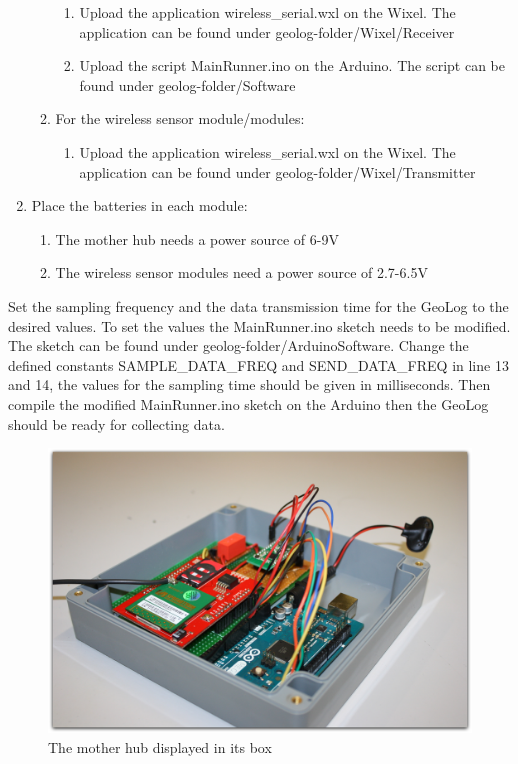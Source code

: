 \begin{enumerate}
\begin{enumerate}
		\begin{enumerate}
		\item Upload the application wireless\_serial.wxl on the Wixel. The application can be found under geolog-folder/Wixel/Receiver
		\item Upload the script MainRunner.ino on the Arduino. The script can be found under geolog-folder/Software
		\end{enumerate}
	\item For the wireless sensor module/modules:
		\begin{enumerate}
		\item Upload the application wireless\_serial.wxl on the Wixel. The application can be found under geolog-folder/Wixel/Transmitter
		\end{enumerate} 
	\end{enumerate}
\item Place the batteries in each module:
	\begin{enumerate}
	\item The mother hub needs a power source of 6-9V
	\item The wireless sensor modules need a power source of 2.7-6.5V
	\end{enumerate}
\end{enumerate}
Set the sampling frequency and the data transmission time for the GeoLog to the desired values. To set the values the MainRunner.ino sketch needs to be modified. The sketch can be found under geolog-folder/ArduinoSoftware. Change the defined constants SAMPLE\_DATA\_FREQ and SEND\_DATA\_FREQ in line 13 and 14, the values for the sampling time should be given in milliseconds. Then compile the modified MainRunner.ino sketch on the Arduino then the GeoLog should be ready for collecting data. %
\begin{figure}[H]
\centering
\includegraphics[width=0.6\linewidth]{graphics/Main_Open.jpg}
\caption{The mother hub displayed in its box\label{fig:Main_Open}}
\end{figure}
